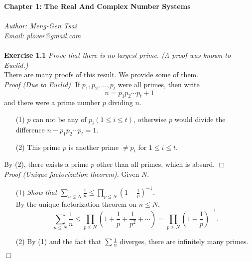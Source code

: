 \documentclass{article}
\begin{document}
\textbf{\Large Chapter 1: The Real And Complex Number Systems} \\\\



\emph{Author: Meng-Gen Tsai} \\
\emph{Email: plover@gmail.com} \\\\



\textbf{Exercise 1.1}
\emph{Prove that there is no largest prime. (A proof was known to Euclid.)} \\

There are many proofs of this result. We provide some of them. \\

\emph{Proof (Due to Euclid).}
If
$p_1, p_2, ..., p_t$ were all primes, then
write $$n = p_1 p_2 \cdots p_t + 1$$
and there were a prime number $p$ dividing $n$.
\begin{enumerate}
\item[(1)]
$p$ can not be any of $p_i (1 \leq i \leq t)$,
otherwise $p$ would divide the difference $n - p_1 p_2 \cdots p_t = 1$.
\item[(2)]
This prime $p$ is another prime $\neq p_i$ for $1 \leq i \leq t$.
\end{enumerate}
By (2), there exists a prime $p$ other than all primes, which is absurd.
$\Box$ \\

\emph{Proof (Unique factorization theorem).}
Given $N$.
\begin{enumerate}
\item[(1)]
\emph{Show that $\sum_{n \leq N} \frac{1}{n}
\leq \prod_{p \leq N} \left( 1 - \frac{1}{p} \right)^{-1}$.} \\
By the unique factorization theorem on $n \leq N$,
$$\sum_{n \leq N} \frac{1}{n}
\leq \prod_{p \leq N} \left( 1 + \frac{1}{p} + \frac{1}{p^2} + \cdots \right)
= \prod_{p \leq N} \left( 1 - \frac{1}{p} \right)^{-1}.$$
\item[(2)]
By (1) and the fact that $\sum \frac{1}{n}$ diverges,
there are infinitely many primes.
\end{enumerate}
$\Box$ \\
\end{document}
